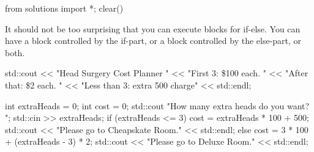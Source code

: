 \begin{python0}
from solutions import *; clear()
\end{python0}

It should not be too surprising that you can execute blocks for if-else.
You can have a block controlled by the if-part, or a block controlled by
the else-part, or both.

\begin{console}
std::cout << "Head Surgery Cost Planner \n"
          << "First 3: \$100 each. \n"
          << "After that: \$2 each. \n"
          << "Less than 3: extra 500 charge"
          << std::endl;

int extraHeads = 0;
int cost = 0;
std::cout  "How many extra heads do you want? ";
std::cin >> extraHeads;
if (extraHeads <= 3)
{
        cost = extraHeads * 100 + 500;
        std::cout << "Please go to Cheapskate Room."
                  << std::endl;
}
else
{
        cost = 3 * 100 + (extraHeads - 3) * 2;
        std::cout << "Please go to Deluxe Room."
                  << std::endl;
}
\end{console}


